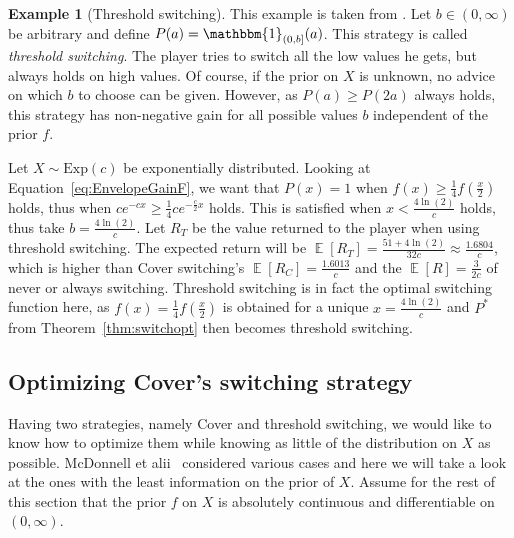 \documentclass[a4paper]{report}
\theoremstyle{plain}
\theoremstyle{definition}
\newtheorem{example}[theorem]{Example}
\theoremstyle{remark}
\numberwithin{equation}{chapter}
\DeclareMathOperator{\E}{\mathbb{E}}
\DeclareMathOperator{\1}{\mathbbm{1}}
\begin{document}
\begin{example}[Threshold switching]
This example is taken from \cite{McDonnell09}. Let $b\in(0,\infty)$ be arbitrary and define $P(a)=\1_{(0,b]}(a)$. This strategy is called \emph{threshold switching}. The player tries to switch all the low values he gets, but always holds on high values. Of course, if the prior on $X$ is unknown, no advice on which $b$ to choose can be given. However, as $P(a)\geq P(2a)$ always holds, this strategy has non-negative gain for all possible values $b$ independent of the prior $f$.

Let $X\sim\text{Exp}(c)$ be exponentially distributed. Looking at Equation~\ref{eq:EnvelopeGainF}, we want that $P(x)=1$ when $f(x)\geq\frac{1}{4}f\left(\frac{x}{2}\right)$ holds, thus when $ce^{-cx}\geq\frac{1}{4}ce^{-\frac{c}{2}x}$ holds. This is satisfied when $x<\frac{4\ln(2)}{c}$ holds, thus take $b=\frac{4\ln(2)}{c}$. Let $R_T$ be the value returned to the player when using threshold switching. The expected return will be $\E[R_T]=\frac{51+4\ln(2)}{32c}\approx\frac{1.6804}{c}$, which is higher than Cover switching's $\E[R_C]=\frac{1.6013}{c}$ and the $\E[R]=\frac{3}{2c}$ of never or always switching. Threshold switching is in fact the optimal switching function here, as $f(x)=\frac{1}{4}f\left(\frac{x}{2}\right)$ is obtained for a unique $x=\frac{4\ln(2)}{c}$ and $P^*$ from Theorem~\ref{thm:switchopt} then becomes threshold switching.
\end{example}
\subsection{Optimizing Cover's switching strategy}
Having two strategies, namely Cover and threshold switching, we would like to know how to optimize them while knowing as little of the distribution on $X$ as possible. McDonnell et alii~\cite{McDonnell11} considered various cases and here we will take a look at the ones with the least information on the prior of $X$. Assume for the rest of this section that the prior $f$ on $X$ is absolutely continuous and differentiable on $(0,\infty)$.
\end{document}
